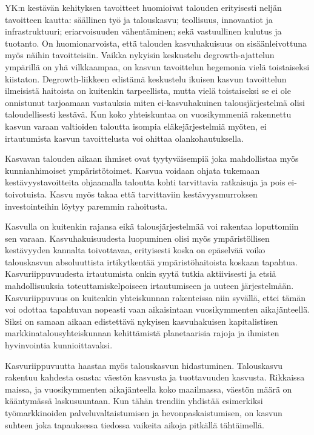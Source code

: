 \documentclass[nobib,finnish,oneside,openany,notoc,a4paper]{tufte-book}
\begin{document}
YK:n kestävän kehityksen tavoitteet huomioivat talouden erityisesti
neljän tavoitteen kautta: säällinen työ ja talouskasvu; teollisuus,
innovaatiot ja infrastruktuuri; eriarvoisuuden vähentäminen; sekä
vastuullinen kulutus ja tuotanto. On huomionarvoista, että talouden
kasvuhakuisuus on sisäänleivottuna myös näihin tavoitteisiin. Vaikka
nykyisin keskustelu degrowth-ajattelun ympärillä on yhä vilkkaampaa, on
kasvun tavoittelun hegemonia vielä toistaiseksi kiistaton.
Degrowth-liikkeen edistämä keskustelu ikuisen kasvun tavoittelun
ilmeisistä haitoista on kuitenkin tarpeellista, mutta vielä toistaiseksi
se ei ole onnistunut tarjoamaan vastauksia miten ei-kasvuhakuinen
talousjärjestelmä olisi taloudellisesti kestävä. Kun koko yhteiskuntaa
on vuosikymmeniä rakennettu kasvun varaan valtioiden taloutta isompia
eläkejärjestelmiä myöten, ei irtautumista kasvun tavoittelusta voi
ohittaa olankohautuksella.

 Kasvavan talouden aikaan  ihmiset ovat
tyytyväisempiä joka mahdollistaa myös kunnianhimoiset ympäristötoimet.
Kasvua voidaan ohjata tukemaan kestävyystavoitteita ohjaamalla taloutta
kohti tarvittavia ratkaisuja ja pois ei-toivotuista. Kasvu myös takaa
että tarvittaviin kestävyysmurroksen investointeihin löytyy paremmin
rahoitusta.

Kasvulla on kuitenkin rajansa eikä talousjärjestelmää voi rakentaa
loputtomiin sen varaan. Kasvuhakuisuudesta luopuminen olisi myös
ympäristöllisen kestävyyden kannalta toivottavaa, erityisesti koska on
epäselvää voiko talouskasvun absoluuttista irtikytkentää
ympäristöhaitoista koskaan tapahtua.  Kasvuriippuvuudesta irtautumista
onkin syytä tutkia aktiivisesti ja etsiä mahdollisuuksia
toteuttamiskelpoiseen irtautumiseen ja uuteen järjestelmään.
Kasvuriippuvuus on kuitenkin yhteiskunnan rakenteissa niin syvällä,
ettei tämän voi odottaa tapahtuvan nopeasti vaan aikaisintaan
vuosikymmenten aikajänteellä. Siksi on samaan aikaan edistettävä
nykyisen kasvuhakuisen kapitalistisen markkinatalousyhteiskunnan
kehittämistä planetaarisia rajoja ja ihmisten hyvinvointia
kunnioittavaksi.

Kasvuriippuvuutta haastaa myös talouskasvun hidastuminen. Talouskasvu
rakentuu kahdesta osasta: väestön kasvusta ja tuottavuuden kasvusta.
Rikkaissa maissa, ja vuosikymmenten aikajänteella koko maailmassa,
väestön määrä on kääntymässä laskusuuntaan. Kun tähän trendiin yhdistää
esimerkiksi työmarkkinoiden palveluvaltaistumisen ja
hevonpaskaistumisen, on kasvun suhteen joka tapauksessa tiedossa
vaikeita aikoja pitkällä tähtäimellä.
\end{document}
